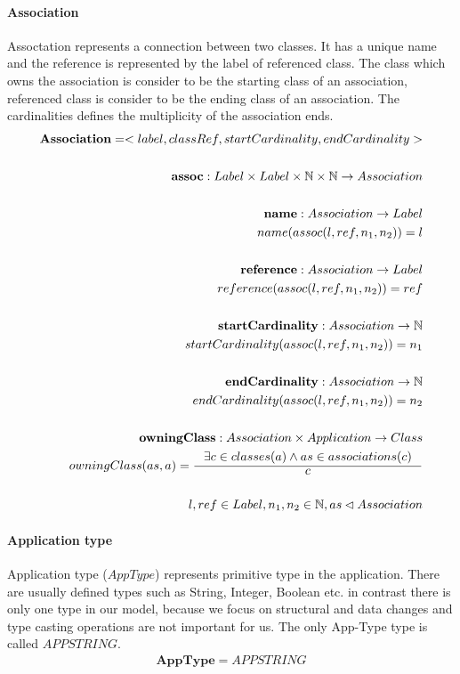 \documentclass[11pt]{article}
\begin{document}
\paragraph {Association} Assoctation represents a connection between two classes. It has a unique name and the reference is represented by the label of referenced class. The class which owns the association is consider to be the starting class of an association, referenced class is consider to be the ending class of an association. The cardinalities defines the multiplicity of the association ends.
\begin{align*}
	\mathbf{Association} = <label, classRef, startCardinality, endCardinality> \\ \\
	\mathbf{assoc} : Label \times Label \times \mathbb{N} \times \mathbb{N} \rightarrow Association\\ \\
	\mathbf{name} : Association \rightarrow Label \\
	name(assoc(l, ref, n_1, n_2)) = l\\ \\
	\mathbf{reference} : Association \rightarrow Label \\
	reference(assoc(l, ref, n_1, n_2)) = ref\\ \\
	\mathbf{startCardinality} : Association \rightarrow \mathbb{N} \\
	startCardinality(assoc(l, ref, n_1, n_2)) = n_1\\ \\
	\mathbf{endCardinality} : Association \rightarrow \mathbb{N} \\
	endCardinality(assoc(l, ref, n_1, n_2)) = n_2 \\ \\
	\mathbf{owningClass} : Association \times Application \rightarrow Class  \\
	owningClass(as, a) = \inference{\exists c \in classes(a) \wedge as \in associations(c)}{c}  \\ \\	
	l, ref \in Label,  n_1, n_2 \in \mathbb{N}, as \lhd Association
\end{align*}



\paragraph{Application type} Application type ($AppType$) represents primitive type in the application. There are usually defined types such as String, Integer, Boolean etc. in contrast there is only one type in our model, because we focus on structural and data changes and type casting operations are not important for us. The only App-Type type is called $APPSTRING$.
\begin{align*}
\mathbf{AppType} = APPSTRING
\end{align*}
\end{document}
